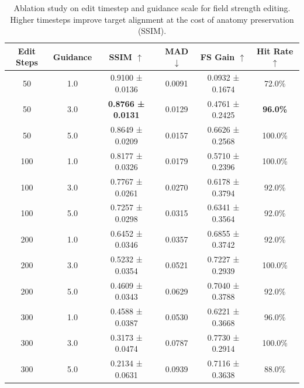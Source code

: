 \begin{table}[t]
\centering
\caption{Ablation study on edit timestep and guidance scale for field strength editing. Higher timesteps improve target alignment at the cost of anatomy preservation (SSIM).}
\label{tab:ablation}
\small
\begin{tabular}{cccccc}
\toprule
Edit Steps & Guidance & SSIM $\uparrow$ & MAD $\downarrow$ & FS Gain $\uparrow$ & Hit Rate $\uparrow$ \\
\midrule
50 & 1.0 & 0.9100 ± 0.0136 & 0.0091 & 0.0932 ± 0.1674 & 72.0\% \\
50 & 3.0 & \textbf{0.8766 ± 0.0131} & 0.0129 & 0.4761 ± 0.2425 & \textbf{96.0\%} \\
50 & 5.0 & 0.8649 ± 0.0209 & 0.0157 & 0.6626 ± 0.2568 & 100.0\% \\
100 & 1.0 & 0.8177 ± 0.0326 & 0.0179 & 0.5710 ± 0.2396 & 100.0\% \\
100 & 3.0 & 0.7767 ± 0.0261 & 0.0270 & 0.6178 ± 0.3794 & 92.0\% \\
100 & 5.0 & 0.7257 ± 0.0298 & 0.0315 & 0.6341 ± 0.3564 & 92.0\% \\
200 & 1.0 & 0.6452 ± 0.0346 & 0.0357 & 0.6855 ± 0.3742 & 92.0\% \\
200 & 3.0 & 0.5232 ± 0.0354 & 0.0521 & 0.7227 ± 0.2939 & 100.0\% \\
200 & 5.0 & 0.4609 ± 0.0343 & 0.0629 & 0.7040 ± 0.3788 & 92.0\% \\
300 & 1.0 & 0.4588 ± 0.0387 & 0.0530 & 0.6221 ± 0.3668 & 96.0\% \\
300 & 3.0 & 0.3173 ± 0.0474 & 0.0787 & 0.7730 ± 0.2914 & 100.0\% \\
300 & 5.0 & 0.2134 ± 0.0631 & 0.0939 & 0.7116 ± 0.3638 & 88.0\% \\
\bottomrule
\end{tabular}
\end{table}